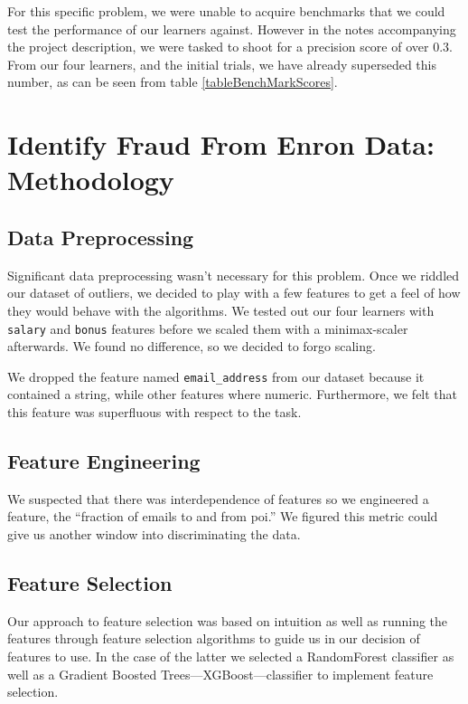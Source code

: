 \documentclass[twoside,openright,titlepage,numbers=noenddot,headinclude,%
               footinclude=true,cleardoublepage=empty,abstractoff,BCOR=5mm,%
               paper=a4,fontsize=11pt,ngerman,american]{scrreprt}
\numberwithin{theorem}{chapter}
\numberwithin{definition}{chapter}
\numberwithin{algorithm}{chapter}
\numberwithin{figure}{chapter}
\numberwithin{table}{chapter}
\numberwithin{equation}{chapter}
\begin{document}
For this specific problem, we were unable to acquire benchmarks that we could test the performance of our learners against. However in the notes accompanying the project description, we were tasked to shoot for a precision score of over 0.3. From our four learners, and the initial trials, we have already superseded this number, as can be seen from table \ref{tableBenchMarkScores}.


\chapter*{Identify Fraud From Enron Data: Methodology}

\section*{Data Preprocessing}
Significant data preprocessing wasn't necessary for this problem. Once we riddled our dataset of outliers, we decided to play with a few features to get a feel of how they would behave with the algorithms. We tested out our four learners with \texttt{salary} and \texttt{bonus} features before we scaled them with a minimax-scaler afterwards. We found no difference, so we decided to forgo scaling.

We dropped the feature named \texttt{email\_address} from our dataset because it contained a string, while other features where numeric. Furthermore, we felt that this feature was superfluous with respect to the task. 

\section*{Feature Engineering}
We suspected that there was interdependence of features so we engineered a feature, the ``fraction of emails to and from poi.'' We figured this metric could give us another window into discriminating the data. 

\section*{Feature Selection}
Our approach to feature selection was based on intuition as well as running the features through feature selection algorithms to guide us in our decision of features to use. In the case of the latter we selected a RandomForest classifier as well as a Gradient Boosted Trees---XGBoost---classifier to implement feature selection.
\end{document}
